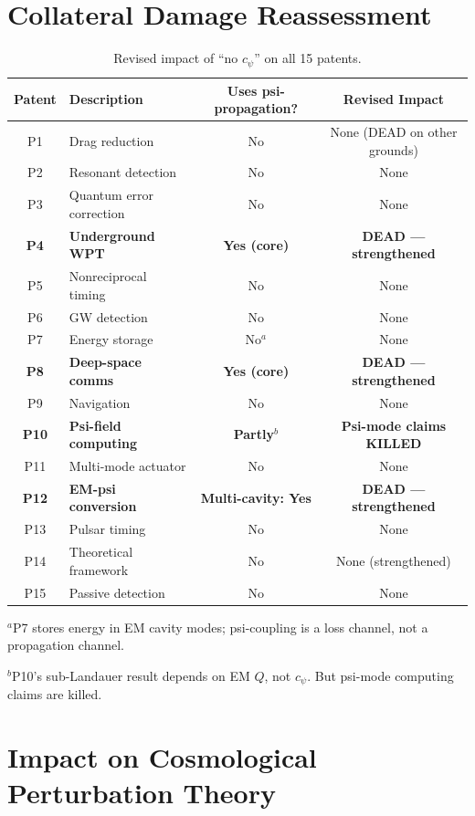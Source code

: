 \documentclass[11pt]{article}
\begin{document}
\section{Collateral Damage Reassessment}

\begin{table}[H]
\centering
\caption{Revised impact of ``no $c_\psi$'' on all 15 patents.}
\label{tab:collateral-revised}
\begin{tabular}{@{}clcc@{}}
\toprule
Patent & Description & Uses psi-propagation? & Revised Impact \\
\midrule
P1 & Drag reduction & No & None (DEAD on other grounds) \\
P2 & Resonant detection & No & None \\
P3 & Quantum error correction & No & None \\
\textbf{P4} & \textbf{Underground WPT} & \textbf{Yes (core)} & \textbf{DEAD --- strengthened} \\
P5 & Nonreciprocal timing & No & None \\
P6 & GW detection & No & None \\
P7 & Energy storage & No$^a$ & None \\
\textbf{P8} & \textbf{Deep-space comms} & \textbf{Yes (core)} & \textbf{DEAD --- strengthened} \\
P9 & Navigation & No & None \\
\textbf{P10} & \textbf{Psi-field computing} & \textbf{Partly}$^b$ & \textbf{Psi-mode claims KILLED} \\
P11 & Multi-mode actuator & No & None \\
\textbf{P12} & \textbf{EM-psi conversion} & \textbf{Multi-cavity: Yes} & \textbf{DEAD --- strengthened} \\
P13 & Pulsar timing & No & None \\
P14 & Theoretical framework & No & None (strengthened) \\
P15 & Passive detection & No & None \\
\bottomrule
\end{tabular}

\smallskip
$^a$P7 stores energy in EM cavity modes; psi-coupling is a loss channel, not a propagation channel.

$^b$P10's sub-Landauer result depends on EM $Q$, not $c_\psi$. But psi-mode computing claims are killed.
\end{table}


\section{Impact on Cosmological Perturbation Theory}
\end{document}
